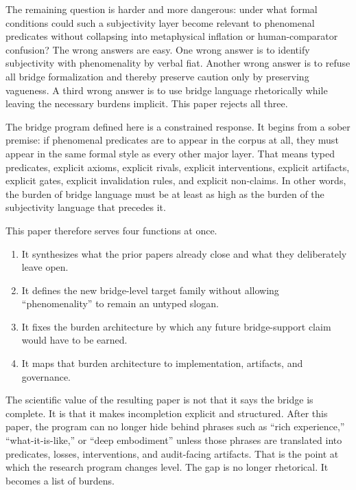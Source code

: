 \documentclass[11pt,a4paper]{article}
\theoremstyle{definition}
\begin{document}
The remaining question is harder and more dangerous: under what formal conditions could such a subjectivity layer become relevant to phenomenal predicates without collapsing into metaphysical inflation or human-comparator confusion? The wrong answers are easy. One wrong answer is to identify subjectivity with phenomenality by verbal fiat. Another wrong answer is to refuse all bridge formalization and thereby preserve caution only by preserving vagueness. A third wrong answer is to use bridge language rhetorically while leaving the necessary burdens implicit. This paper rejects all three.

The bridge program defined here is a constrained response. It begins from a sober premise: if phenomenal predicates are to appear in the corpus at all, they must appear in the same formal style as every other major layer. That means typed predicates, explicit axioms, explicit rivals, explicit interventions, explicit artifacts, explicit gates, explicit invalidation rules, and explicit non-claims. In other words, the burden of bridge language must be at least as high as the burden of the subjectivity language that precedes it.

This paper therefore serves four functions at once.
\begin{enumerate}[leftmargin=1.5em]
\item It synthesizes what the prior papers already close and what they deliberately leave open.
\item It defines the new bridge-level target family without allowing ``phenomenality'' to remain an untyped slogan.
\item It fixes the burden architecture by which any future bridge-support claim would have to be earned.
\item It maps that burden architecture to implementation, artifacts, and governance.
\end{enumerate}

The scientific value of the resulting paper is not that it says the bridge is complete. It is that it makes incompletion explicit and structured. After this paper, the program can no longer hide behind phrases such as ``rich experience,'' ``what-it-is-like,'' or ``deep embodiment'' unless those phrases are translated into predicates, losses, interventions, and audit-facing artifacts. That is the point at which the research program changes level. The gap is no longer rhetorical. It becomes a list of burdens.
\end{document}
